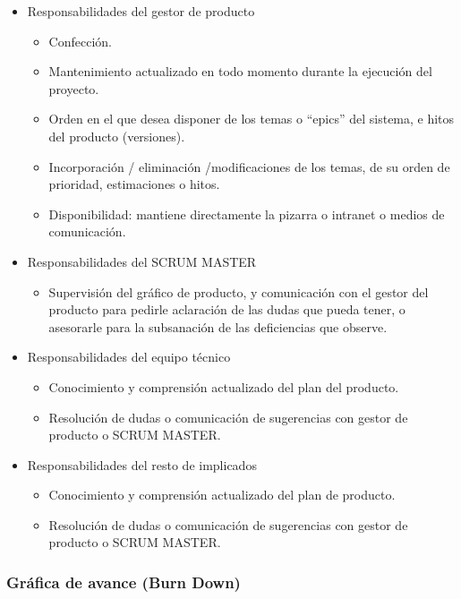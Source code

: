 	\begin{itemize}
		\item Responsabilidades del gestor de producto
		\begin{itemize}
			\item	Confección.
			\item	Mantenimiento actualizado en todo momento durante la ejecución del proyecto.
			\item	Orden en el que desea disponer de los temas o “epics” del sistema, e hitos del producto (versiones). 
			\item	Incorporación / eliminación /modificaciones de los temas, de su orden de prioridad, estimaciones o hitos.
			\item	Disponibilidad:  mantiene directamente la pizarra o intranet o medios de comunicación.
		\end{itemize}
		\item Responsabilidades del SCRUM MASTER
		\begin{itemize}
			\item Supervisión del gráfico de producto, y comunicación con el gestor del producto para pedirle aclaración de las dudas que pueda tener, o asesorarle para la subsanación de las deficiencias que observe.
		\end{itemize}		
		\item Responsabilidades del equipo técnico
		\begin{itemize}
			\item	Conocimiento y comprensión actualizado del plan del producto. 
			\item	Resolución de dudas o comunicación de sugerencias con gestor de producto o SCRUM MASTER.
		\end{itemize}	
		\item Responsabilidades del resto de implicados
		\begin{itemize}
			\item	Conocimiento y comprensión actualizado del plan de producto.
			\item	Resolución de dudas o comunicación de sugerencias con gestor de producto o SCRUM MASTER.
		\end{itemize}	
	\end{itemize}

\subsubsection{Gráfica de avance (Burn Down)}

